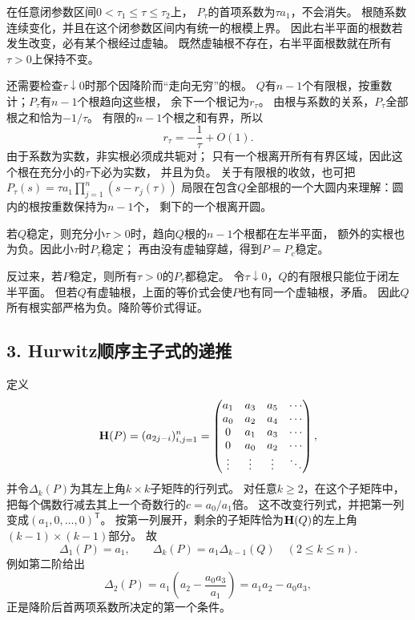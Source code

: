 在任意闭参数区间$0<\tau_1\le\tau\le\tau_2$上，
$P_\tau$的首项系数为$\tau a_1$，不会消失。
根随系数连续变化，并且在这个闭参数区间内有统一的根模上界。
因此右半平面的根数若发生改变，必有某个根经过虚轴。
既然虚轴根不存在，右半平面根数就在所有$\tau>0$上保持不变。

还需要检查$\tau\downarrow0$时那个因降阶而“走向无穷”的根。
$Q$有$n-1$个有限根，按重数计；$P_\tau$有$n-1$个根趋向这些根，
余下一个根记为$r_\tau$。
由根与系数的关系，$P_\tau$全部根之和恰为$-1/\tau$。
有限的$n-1$个根之和有界，所以
\[
 r_\tau=-\frac1\tau+O(1).
\]
由于系数为实数，非实根必须成共轭对；
只有一个根离开所有有界区域，因此这个根在充分小的$\tau$下必为实数，
并且为负。
关于有限根的收敛，也可把
$P_\tau(s)=\tau a_1\prod_{j=1}^n(s-r_j(\tau))$
局限在包含$Q$全部根的一个大圆内来理解：圆内的根按重数保持为$n-1$个，
剩下的一个根离开圆。

若$Q$稳定，则充分小$\tau>0$时，趋向$Q$根的$n-1$个根都在左半平面，
额外的实根也为负。因此小$\tau$时$P_\tau$稳定；
再由没有虚轴穿越，得到$P=P_c$稳定。

反过来，若$P$稳定，则所有$\tau>0$的$P_\tau$都稳定。
令$\tau\downarrow0$，$Q$的有限根只能位于闭左半平面。
但若$Q$有虚轴根，上面的等价式会使$P$也有同一个虚轴根，矛盾。
因此$Q$所有根实部严格为负。降阶等价式得证。

\subsection*{3. Hurwitz顺序主子式的递推}

定义
\[
 \mathbf{H}(P)=(a_{2j-i})_{i,j=1}^n
 =
 \begin{pmatrix}
 a_1&a_3&a_5&\cdots\\
 a_0&a_2&a_4&\cdots\\
 0&a_1&a_3&\cdots\\
 0&a_0&a_2&\cdots\\
 \vdots&\vdots&\vdots&\ddots
 \end{pmatrix},
\]
并令$\Delta_k(P)$为其左上角$k\times k$子矩阵的行列式。
对任意$k\ge2$，在这个子矩阵中，
把每个偶数行减去其上一个奇数行的$c=a_0/a_1$倍。
这不改变行列式，并把第一列变成$(a_1,0,\ldots,0)^{\mathsf T}$。
按第一列展开，剩余的子矩阵恰为$\mathbf{H}(Q)$的左上角$(k-1)\times(k-1)$部分。
故
\begin{equation}
 \Delta_1(P)=a_1,\qquad
 \Delta_k(P)=a_1\Delta_{k-1}(Q)\quad(2\le k\le n).
 \label{eq:hurwitz-recursion}
\end{equation}
例如第二阶给出
\[
 \Delta_2(P)
 =a_1\left(a_2-\frac{a_0a_3}{a_1}\right)
 =a_1a_2-a_0a_3,
\]
正是降阶后首两项系数所决定的第一个条件。

